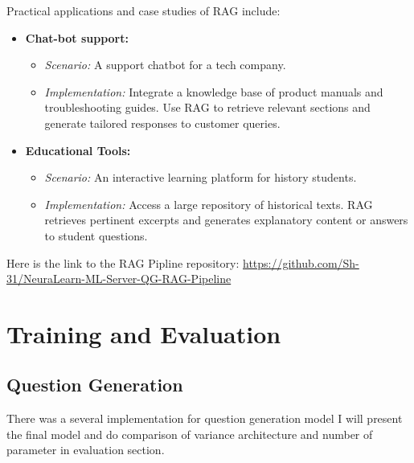 \newpage
Practical applications and case studies of RAG include:
\begin{itemize}
    \item \textbf{Chat-bot support:}
    \begin{itemize}
        \item \textit{Scenario:} A support chatbot for a tech company.
        \item \textit{Implementation:} Integrate a knowledge base of product manuals and troubleshooting guides. Use RAG to retrieve relevant sections and generate tailored responses to customer queries.
    \end{itemize}
    \item \textbf{Educational Tools:}
    \begin{itemize}
        \item \textit{Scenario:} An interactive learning platform for history students.
        \item \textit{Implementation:} Access a large repository of historical texts. RAG retrieves pertinent excerpts and generates explanatory content or answers to student questions.
    \end{itemize}
    
\end{itemize}

\hfill \break
Here is the link to the RAG Pipline repository: \url{https://github.com/Sh-31/NeuraLearn-ML-Server-QG-RAG-Pipeline}

\newpage

\section{Training and Evaluation}
\subsection{Question Generation}

There was a several implementation for question generation model
I will present the final model and do comparison of variance architecture and number of parameter in evaluation section.

